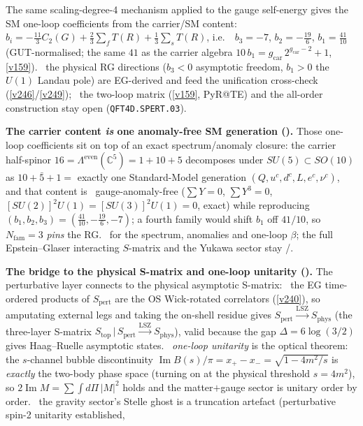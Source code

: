 \documentclass[11pt,a4paper]{article}
\newcommand{\Nfam}{N_{\mathrm{fam}}}
\newcommand{\gcar}{g_{\mathrm{car}}}
\begin{document}
\begin{keybox}
The same scaling-degree-4 mechanism applied to the gauge self-energy gives the SM one-loop coefficients from the
carrier/SM content: $b_i=-\tfrac{11}{3}C_2(G)+\tfrac23\sum_f T(R)+\tfrac13\sum_s T(R)$, i.e.\ \mE\
$b_3=-7$, $b_2=-\tfrac{19}{6}$, $b_1=\tfrac{41}{10}$ (GUT-normalised; the same $41$ as the carrier algebra
$10\,b_1=\gcar\,2^{\gcar-2}+1$, \vref{v159}). \mC\ the physical RG directions ($b_3<0$ asymptotic freedom, $b_1>0$
the $U(1)$ Landau pole) are EG-derived and feed the unification cross-check (\vref{v246}/\vref{v249}); \mO\ the
two-loop matrix (\vref{v159}, PyR@TE) and the all-order construction stay open (\texttt{QFT4D.SPERT.03}).
\par\smallskip\noindent\textbf{The carrier content \emph{is} one anomaly-free SM generation ().}
Those one-loop coefficients sit on top of an exact spectrum/anomaly closure: the carrier half-spinor
$16=\Lambda^{\mathrm{even}}(\mathbb C^5)=1{+}10{+}5$ decomposes under $SU(5)\subset SO(10)$ as $10{+}\bar5{+}1=$ exactly
one Standard-Model generation $(Q,u^c,d^c,L,e^c,\nu^c)$, and that content is \mE\ gauge-anomaly-free
($\sum Y=0$, $\sum Y^3=0$, $[SU(2)]^2U(1)=[SU(3)]^2U(1)=0$, exact) while reproducing $(b_1,b_2,b_3)=
(\tfrac{41}{10},-\tfrac{19}{6},-7)$; a fourth family would shift $b_1$ off $41/10$, so $\Nfam{=}3$ \emph{pins} the RG.
\mE\ for the spectrum, anomalies and one-loop $\beta$; the full Epstein--Glaser interacting $S$-matrix and the Yukawa
sector stay \mC/\mO.
\par\smallskip\noindent\textbf{The bridge to the physical S-matrix and one-loop unitarity ().}
The perturbative layer connects to the physical asymptotic S-matrix: \mE\ the EG time-ordered products of
$S_{\mathrm{pert}}$ are the OS Wick-rotated correlators (\vref{v240}), so amputating external legs and taking the
on-shell residue gives $S_{\mathrm{pert}}\xrightarrow{\mathrm{LSZ}}S_{\mathrm{phys}}$ (the three-layer S-matrix
$S_{\mathrm{top}}\,|\,S_{\mathrm{pert}}\xrightarrow{\mathrm{LSZ}}S_{\mathrm{phys}}$), valid because the gap
$\Delta{=}6\log(3/2)$ gives Haag--Ruelle asymptotic states. \mE\ \emph{one-loop unitarity} is the optical
theorem: the $s$-channel bubble discontinuity $\operatorname{Im}B(s)/\pi=x_+{-}x_-=\sqrt{1-4m^2/s}$ is
\emph{exactly} the two-body phase space (turning on at the physical threshold $s{=}4m^2$), so
$2\operatorname{Im}M=\sum\!\int d\Pi\,|M|^2$ holds and the matter$+$gauge sector is unitary order by order.
\mC\ the gravity sector's Stelle ghost is a truncation artefact (perturbative spin-2 unitarity established,

\end{keybox}
\end{document}

